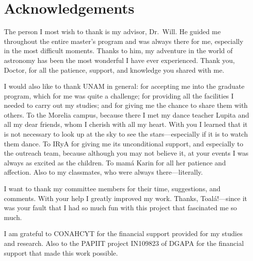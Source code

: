 \documentclass{book}
\begin{document}



\chapter*{Acknowledgements}

The person I most wish to thank is my advisor, Dr.~Will. He guided me throughout the entire master’s program and was always there for me, especially in the most difficult moments. Thanks to him, my adventure in the world of astronomy has been the most wonderful I have ever experienced. Thank you, Doctor, for all the patience, support, and knowledge you shared with me.  

I would also like to thank UNAM in general: for accepting me into the graduate program, which for me was quite a challenge; for providing all the facilities I needed to carry out my studies; and for giving me the chance to share them with others. To the Morelia campus, because there I met my dance teacher Lupita and all my dear friends, whom I cherish with all my heart. With you I learned that it is not necessary to look up at the sky to see the stars—especially if it is to watch them dance. To IRyA for giving me its unconditional support, and especially to the outreach team, because although you may not believe it, at your events I was always as excited as the children. To mamá Karin for all her patience and affection. Also to my classmates, who were always there—literally.  

I want to thank my committee members for their time, suggestions, and comments. With your help I greatly improved my work. Thanks, Toalá!—since it was your fault that I had so much fun with this project that fascinated me so much.  

I am grateful to CONAHCYT for the financial support provided for my studies and research. Also to the PAPIIT project IN109823 of DGAPA for the financial support that made this work possible.  
\end{document}
